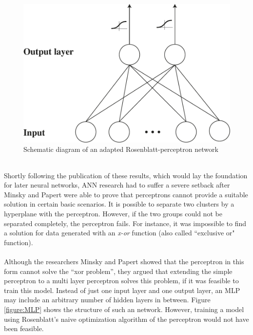 \documentclass[11pt,a4paper]{article}
\begin{document}
\begin{figure}[h]
	\centering
	\includegraphics[scale=0.5]{adaption_perceptron2.pdf}
	\caption{Schematic diagram of an adapted Rosenblatt-perceptron network}
	\label{adaption_perceptron}
\end{figure}
\ \\
Shortly following the publication of these results, which would lay the foundation for later neural networks, ANN research had to suffer a severe setback after Minsky and Papert \cite{Minsky1969} were able to prove that perceptrons cannot provide a suitable solution in certain basic scenarios. It is possible to separate two clusters by a hyperplane with the perceptron. However, if the two groups could not be separated completely, the perceptron fails. For instance, it was impossible to find a solution for data generated with an \textit{x-or} function (also called ``exclusive or" function).\\
\ \\
Although the researchers Minsky and Papert showed that the perceptron in this form cannot solve the “xor problem”, they argued that extending the simple perceptron to a multi layer perceptron solves this problem, if it was feasible to train this model. Instead of just one input layer and one output layer, an MLP may include an arbitrary number of hidden layers in between. Figure \ref{figure:MLP} shows the structure of such an network. However, training a model using Rosenblatt's naive optimization algorithm of the perceptron would not have been feasible.\\
\end{document}
